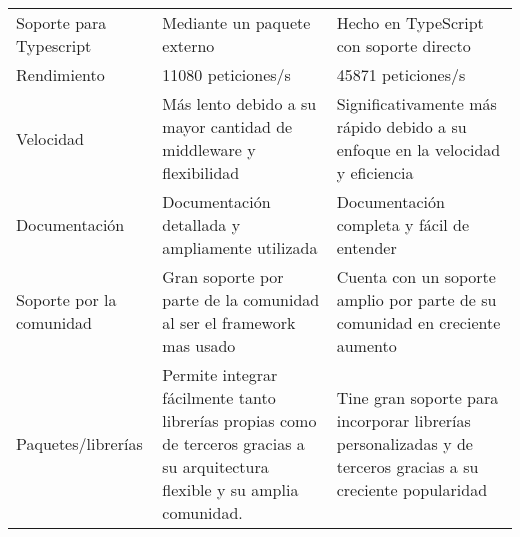 \begin{longtable}{|p{5cm}|p{5cm}|p{5cm}|}
    \hline \hline
    \endlastfoot
    Soporte para Typescript                        & Mediante un paquete externo                                                                                                    & Hecho en TypeScript con soporte directo                                                                     \\
    Rendimiento                                    & 11080 peticiones/s                                                                                                             & 45871 peticiones/s                                                                                          \\
    Velocidad                                      & Más lento debido a su mayor cantidad de middleware y flexibilidad                                                              & Significativamente más rápido debido a su enfoque en la velocidad y eficiencia                              \\
    Documentación                                  & Documentación detallada y ampliamente utilizada                                                                                & Documentación completa y fácil de entender                                                                  \\
    Soporte por la comunidad                       & Gran soporte por parte de la comunidad al ser el framework mas usado                                                           & Cuenta con un soporte amplio por parte de su comunidad en creciente aumento                                 \\
    Paquetes/librerías                             & Permite integrar fácilmente tanto librerías propias como de terceros gracias a su arquitectura flexible y su amplia comunidad. & Tine gran soporte para incorporar librerías personalizadas y de terceros gracias a su creciente popularidad \\
\end{longtable}